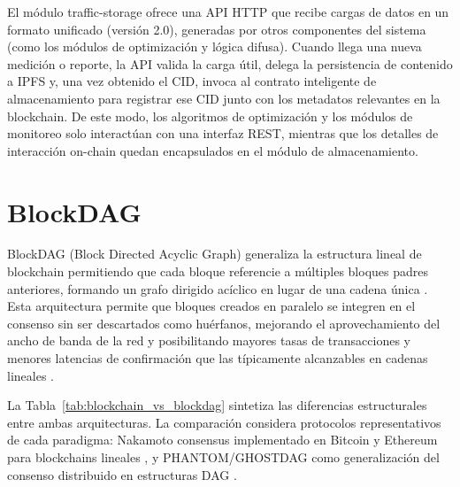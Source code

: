 El módulo traffic-storage ofrece una API HTTP que recibe cargas de datos en un formato unificado (versión 2.0), generadas por otros componentes del sistema (como los módulos de optimización y lógica difusa). Cuando llega una nueva medición o reporte, la API valida la carga útil, delega la persistencia de contenido a IPFS y, una vez obtenido el CID, invoca al contrato inteligente de almacenamiento para registrar ese CID junto con los metadatos relevantes en la blockchain. De este modo, los algoritmos de optimización y los módulos de monitoreo solo interactúan con una interfaz REST, mientras que los detalles de interacción on-chain quedan encapsulados en el módulo de almacenamiento.

\section{BlockDAG}
\label{subsec:blockdag_traffic_storage}

BlockDAG (Block Directed Acyclic Graph) generaliza la estructura lineal de blockchain permitiendo que cada bloque referencie a múltiples bloques padres anteriores, formando un grafo dirigido acíclico en lugar de una cadena única \cite{wang2023dag,sompolinsky2021phantom}. Esta arquitectura permite que bloques creados en paralelo se integren en el consenso sin ser descartados como huérfanos, mejorando el aprovechamiento del ancho de banda de la red y posibilitando mayores tasas de transacciones y menores latencias de confirmación que las típicamente alcanzables en cadenas lineales \cite{wang2023dag}.

La Tabla~\ref{tab:blockchain_vs_blockdag} sintetiza las diferencias estructurales entre ambas arquitecturas. La comparación considera protocolos representativos de cada paradigma: Nakamoto consensus implementado en Bitcoin y Ethereum para blockchains lineales \cite{nakamoto2008bitcoin,buterin2014ethereum}, y PHANTOM/GHOSTDAG como generalización del consenso distribuido en estructuras DAG \cite{sompolinsky2021phantom}.


